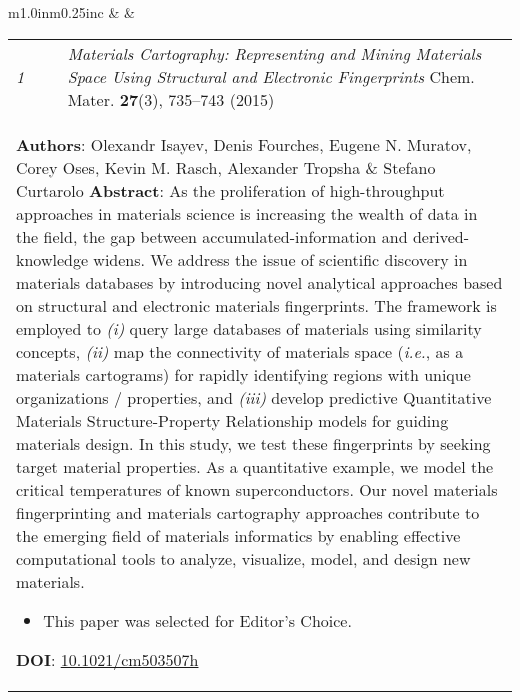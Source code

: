 \documentclass[11pt]{article}
\begin{document}
\begin{tabular}{m{1.0in}m{0.25in}c}
 & & 
\begin{tabular}{m{0.3in}m{0.15in}m{4.3in}}
\textit{\small{1}} & & \textit{Materials Cartography: Representing and Mining Materials Space Using Structural and Electronic Fingerprints} \newline Chem. Mater. \textbf{27}(3), 735--743 (2015)  \\ \multicolumn{3}{p{4.75in}}{\footnotesize{\textbf{Authors}: Olexandr Isayev, Denis Fourches, Eugene N. Muratov, \textcolor{NavyBlue}{Corey Oses}, Kevin M. Rasch, Alexander Tropsha \& Stefano Curtarolo \newline \textbf{Abstract}: As the proliferation of high-throughput approaches in materials science is increasing the wealth of data in the field, the gap between accumulated-information and derived-knowledge widens. We address the issue of scientific discovery in materials databases by introducing novel analytical approaches based on structural and electronic materials fingerprints. The framework is employed to \textit{(i)} query large databases of materials using similarity concepts, \textit{(ii)} map the connectivity of materials space (\textit{i.e.}, as a materials cartograms) for rapidly identifying regions with unique organizations / properties, and \textit{(iii)} develop predictive Quantitative Materials Structure-Property Relationship models for guiding materials design. In this study, we test these fingerprints by seeking target material properties. As a quantitative example, we model the critical temperatures of known superconductors. Our novel materials fingerprinting and materials cartography approaches contribute to the emerging field of materials informatics by enabling effective computational tools to analyze, visualize, model, and design new materials. \noindent\begin{itemize}[leftmargin=*] \item This paper was selected for \textcolor{NavyBlue}{Editor's Choice}. \end{itemize} \textbf{DOI}: \href{http://dx.doi.org/10.1021/cm503507h}{10.1021/cm503507h}}} 
\end{tabular} \\ 
\end{tabular}

\vspace{0.5cm}

\noindent\hspace{0cm}\textcolor{black}{\textsc{}}
\end{document}
